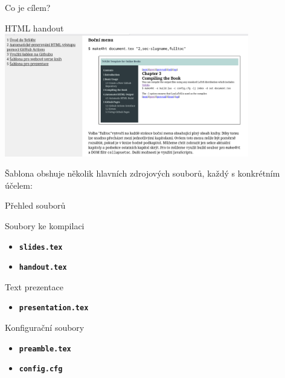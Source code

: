 \begin{frame}[fragile]{Co je cílem?}
\begin{block}{HTML handout}
\includegraphics[width=0.8\textwidth]{img/handout.png}
\end{block}

\end{frame}


Šablona obshuje několik hlavních zdrojových souborů, každý s konkrétním účelem:

\begin{frame}[fragile]{Přehled souborů}
\begin{block}{Soubory ke kompilaci}
\begin{itemize}
\item \textbf{\texttt{slides.tex}}
\item \textbf{\texttt{handout.tex}}
\end{itemize}
\end{block}
\begin{block}{Text prezentace}
\begin{itemize}
\item \textbf{\texttt{presentation.tex}}
\end{itemize}
\end{block}
\begin{block}{Konfigurační soubory}
\begin{itemize}
\item \textbf{\texttt{preamble.tex}}
\item \textbf{\texttt{config.cfg}}
\end{itemize}
\end{block}
\end{frame}

